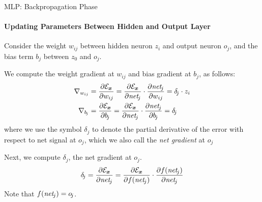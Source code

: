 \begin{frame}{MLP: Backpropagation Phase}
\framesubtitle{Updating Parameters Between Hidden and Output Layer}
%
Consider the weight $w_{ij}$ between hidden neuron $z_i$ and
output neuron $o_{\!j}$, and the bias term $b_{\!j}$
between $z_0$ and $o_{\!j}$. 

\medskip

We compute the weight gradient at $w_{ij}$ and bias gradient at
$b_{\!j}$, as
follows:
\begin{align*}
    \begin{aligned}
    \grad_{w_{ij}} & = 
 \frac{\partial \cE_\bx}{\partial w_{ij}}
     = \frac{\partial \cE_\bx}{\partial \net_{\!j}} \cdot 
    \frac{\partial \net_{\!j}}{\partial w_{ij}}
    = \delta_{\!j}  \cdot z_i\\
    \grad_{b_{\!j}} & = 
 \frac{\partial \cE_\bx}{\partial b_{\!j}}
     = \frac{\partial \cE_\bx}{\partial \net_{\!j}} \cdot 
    \frac{\partial \net_{\!j}}{\partial b_{\!j}}
    = \delta_{\!j}
\end{aligned}
\end{align*}
where we use the symbol $\delta_{\!j}$ to denote the partial derivative of
the error with respect to net signal at $o_{\!j}$, which we also call the
{\em net gradient} at $o_{\!j}$
%

\medskip

Next, we %
compute $\delta_{\!j}$, the net gradient at
$o_{\!j}$. %
\begin{align*}
    \delta_{\!j} = \frac{\partial {\mathcal E}_{\boldsymbol x}}{\partial \mathit{net}_{\!j}} =
   \frac{\partial {\mathcal E}_{\boldsymbol x}}{\partial f(\mathit{net}_{\!j})} \cdot
\frac{\partial f(\mathit{net}_{\!j})}{\partial \mathit{net}_{\!j}}
\end{align*}
Note that $f(\mathit{net}_{\!j}) = o_{\!j}$.
\end{frame}

